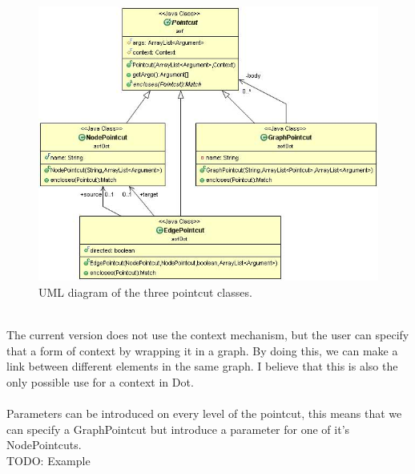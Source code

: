 \documentclass[a4paper]{report}
\begin{document}
\begin{figure}
\centering
\includegraphics[scale=0.6]{images/AOFDot/DotPointcuts.jpg}
\caption{UML diagram of the three pointcut classes.}
\label{fig:DotPointcuts}
\end{figure}
\\
The current version does not use the context mechanism, but the user can specify that a form of context by wrapping it in a graph. By doing this, we can make a link between different elements in the same graph. I believe that this is also the only possible use for a context in Dot.\\
\\
Parameters can be introduced on every level of the pointcut, this means that we can specify a GraphPointcut but introduce a parameter for one of it's NodePointcuts.\\
TODO: Example
\end{document}
